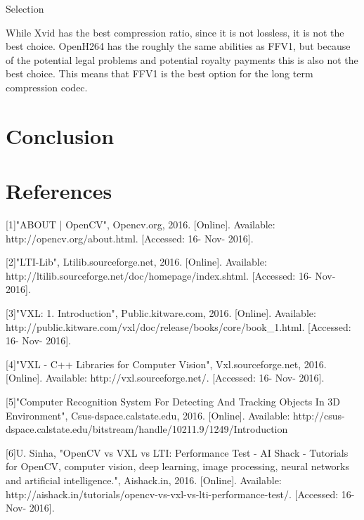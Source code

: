\documentclass[letterpaper,10pt,onecolumn,draftclsnofoot]{IEEEtran}
\begin{document}
Selection

While Xvid has the best compression ratio, since it is not lossless, it is not the best choice.
OpenH264 has the roughly the same abilities as FFV1, but because of the potential legal problems and potential royalty payments this is also not the best choice.
This means that FFV1 is the best option for the long term compression codec.

\newpage
\section{Conclusion}

\section{References}

[1]"ABOUT | OpenCV", Opencv.org, 2016. [Online]. Available: http://opencv.org/about.html. [Accessed: 16- Nov- 2016].

[2]"LTI-Lib", Ltilib.sourceforge.net, 2016. [Online]. Available: http://ltilib.sourceforge.net/doc/homepage/index.shtml. [Accessed: 16- Nov- 2016].

[3]"VXL: 1. Introduction", Public.kitware.com, 2016. [Online]. Available: http://public.kitware.com/vxl/doc/release/books/core/book_1.html. [Accessed: 16- Nov- 2016].

[4]"VXL - C++ Libraries for Computer Vision", Vxl.sourceforge.net, 2016. [Online]. Available: http://vxl.sourceforge.net/. [Accessed: 16- Nov- 2016].

[5]"Computer Recognition System For Detecting And Tracking Objects In 3D Environment", Csus-dspace.calstate.edu, 2016. [Online]. Available: http://csus-dspace.calstate.edu/bitstream/handle/10211.9/1249/Introduction%

[6]U. Sinha, "OpenCV vs VXL vs LTI: Performance Test - AI Shack - Tutorials for OpenCV, computer vision, deep learning, image processing, neural networks and artificial intelligence.", Aishack.in, 2016. [Online]. Available: http://aishack.in/tutorials/opencv-vs-vxl-vs-lti-performance-test/. [Accessed: 16- Nov- 2016].




\end{document}
